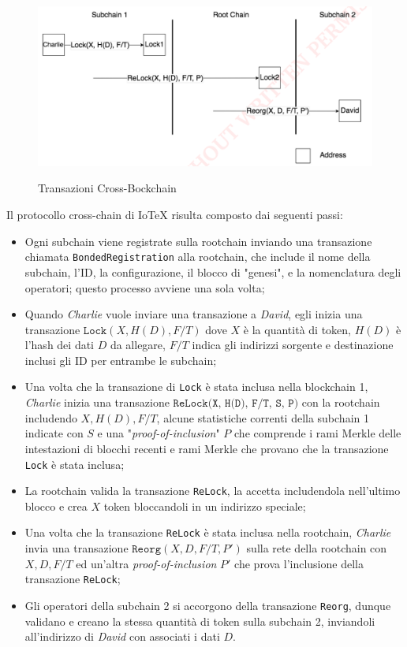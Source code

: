 \begin{figure}[ht]
	\includegraphics[width=\textwidth]{Figura2.png}
	\label{fig:fig2}
	\caption{Transazioni Cross-Bockchain}
\end{figure}

Il protocollo cross-chain di IoTeX risulta composto dai seguenti passi:

\begin{itemize}
	\item Ogni subchain viene registrate sulla rootchain inviando una transazione chiamata \texttt{BondedRegistration} alla rootchain, che include il nome della subchain, l'ID, la configurazione, il blocco di "genesi", e la nomenclatura degli operatori; questo processo avviene una sola volta;

	\item Quando \emph{Charlie} vuole inviare una transazione a \emph{David}, egli inizia una transazione $\texttt{Lock}(X, H(D), F/T)$ dove $X$ è la quantità di token, $H(D)$ è l'hash dei dati $D$ da allegare, $F/T$ indica gli indirizzi sorgente e destinazione inclusi gli ID per entrambe le subchain;

	\item Una volta che la transazione di \texttt{Lock} è stata inclusa nella blockchain 1, \emph{Charlie} inizia una transazione $\texttt{ReLock(X, H(D), F/T, S, P)}$ con la rootchain includendo $X, H(D), F/T$, alcune statistiche correnti della subchain 1 indicate con $S$ e una "\emph{proof-of-inclusion}" $P$ che comprende i rami Merkle delle intestazioni di blocchi recenti e rami Merkle che provano che la transazione \texttt{Lock} è stata inclusa;

	\item La rootchain valida la transazione \texttt{ReLock}, la accetta includendola nell'ultimo blocco e crea $X$ token bloccandoli in un indirizzo speciale;

	\item Una volta che la transazione \texttt{ReLock} è stata inclusa nella rootchain, \emph{Charlie} invia una transazione $\texttt{Reorg}(X, D, F/T, P')$ sulla rete della rootchain con $X, D, F/T$ ed un'altra \emph{proof-of-inclusion} $P'$ che prova l'inclusione della transazione \texttt{ReLock};

	\item Gli operatori della subchain 2 si accorgono della transazione \texttt{Reorg}, dunque validano e creano la stessa quantità di token sulla subchain 2, inviandoli all'indirizzo di \emph{David} con associati i dati $D$.

\end{itemize}

